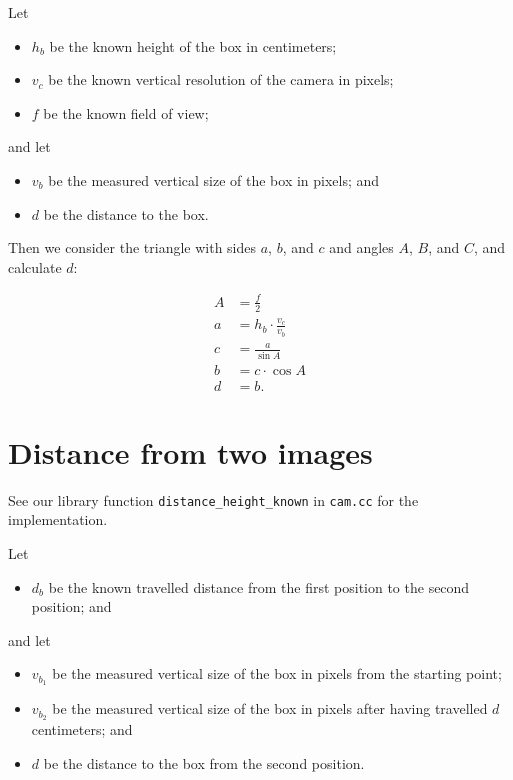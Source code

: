 \documentclass[a4paper,12pt]{article}
\begin{document}
Let
\begin{itemize}
\item $h_b$ be the known height of the box in centimeters;
\item $v_c$ be the known vertical resolution of the camera in pixels;
\item $f$ be the known field of view;
\end{itemize}

and let
\begin{itemize}
\item $v_b$ be the measured vertical size of the box in pixels; and
\item $d$ be the distance to the box.
\end{itemize}

Then we consider the triangle with sides $a$, $b$, and $c$ and angles $A$, $B$,
and $C$, and calculate $d$:

\begin{align*}
  A &= \frac{f}{2}\\
  a &= h_b \cdot \frac{v_c}{v_b}\\
  c &= \frac{a}{\sin A}\\
  b &= c \cdot \cos A\\
  d &= b.
\end{align*}


\section{Distance from two images}

See our library function \texttt{distance_height_known} in \texttt{cam.cc} for
the implementation.

Let

\begin{itemize}
\item $d_b$ be the known travelled distance from the first position to the
second position; and
\end{itemize}

and let

\begin{itemize}
\item $v_{b_1}$ be the measured vertical size of the box in pixels from the
starting point;
\item $v_{b_2}$ be the measured vertical size of the box in pixels after having
travelled $d$ centimeters; and
\item $d$ be the distance to the box from the second position.
\end{itemize}
\end{document}
